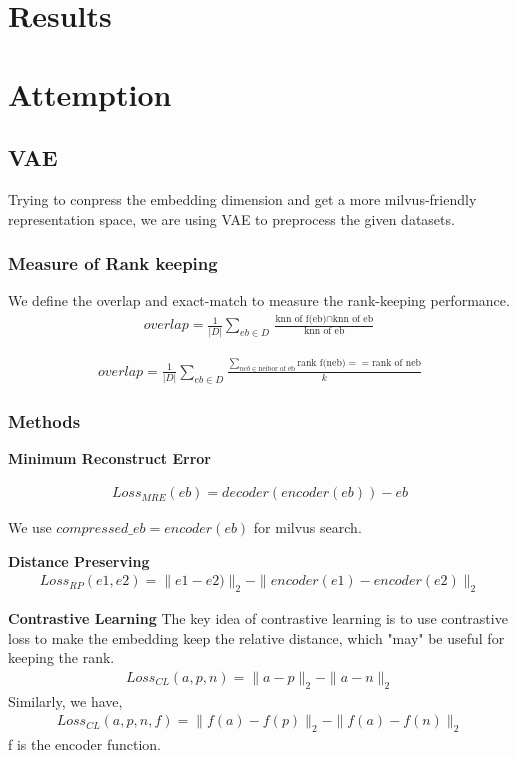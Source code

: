 \documentclass{ol-softwaremanual}
\begin{document}
\newpage
\section{Results}


\section{Attemption}
\subsection{VAE}


Trying to conpress the embedding dimension and get a more milvus-friendly representation space, we are using VAE to preprocess the given datasets.


\subsubsection{Measure of Rank keeping}
We define the overlap and exact-match to measure the rank-keeping performance.
\begin{align}
    overlap = \frac{1}{|D|} \sum_{eb \in D} \frac{\text{knn of f(eb)} \cap \text{knn of eb}}{\text{knn of eb}}
\end{align}

\begin{align}
    overlap = \frac{1}{|D|} \sum_{eb \in D}  \frac{\sum_{neb\in \text{neibor of eb}}\text{rank f(neb)} == \text{rank of neb}}{k}
\end{align}

\subsubsection{Methods}

\textbf{Minimum Reconstruct Error}

\begin{align}
    Loss_{MRE}(eb) = decoder(encoder(eb)) - eb
\end{align}

We use $compressed\_eb = encoder(eb)$ for milvus search.

\textbf{Distance Preserving}
\begin{align}
    Loss_{RP}(e1, e2) = \|e1 - e2)\|_2 - \|encoder(e1) - encoder(e2)\|_2
\end{align}

\textbf{Contrastive Learning}
The key idea of contrastive learning is to use contrastive loss to make the embedding keep the relative distance, which "may" be useful for keeping the rank.
\begin{align}
    Loss_{CL}(a, p, n) = \|a - p\|_2 - \|a-n\|_2
\end{align}
Similarly, we have,
\begin{align}
    Loss_{CL}(a, p, n ,f) = \|f(a) - f(p)\|_2 - \|f(a)-f(n)\|_2
\end{align}
f is the encoder function.
\end{document}
